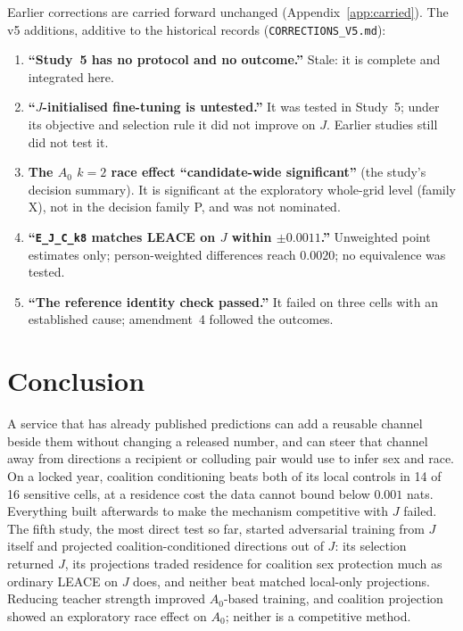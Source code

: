\documentclass[10pt]{article}
\begin{document}
Earlier corrections are carried forward unchanged (Appendix~\ref{app:carried}). The v5 additions, additive to
the historical records (\texttt{CORRECTIONS\_V5.md}):
\begin{enumerate}\itemsep1pt
\item \textbf{``Study~5 has no protocol and no outcome.''} Stale: it is complete and integrated here.
\item \textbf{``$J$-initialised fine-tuning is untested.''} It was tested in Study~5; under its objective and
selection rule it did not improve on $J$. Earlier studies still did not test it.
\item \textbf{The $A_0$ $k=2$ race effect ``candidate-wide significant''} (the study's decision summary). It is
significant at the exploratory whole-grid level (family X), not in the decision family P, and was not nominated.
\item \textbf{``\texttt{E\_J\_C\_k8} matches LEACE on $J$ within $\pm0.0011$.''} Unweighted point estimates only;
person-weighted differences reach $0.0020$; no equivalence was tested.
\item \textbf{``The reference identity check passed.''} It failed on three cells with an established cause;
amendment~4 followed the outcomes.
\end{enumerate}

\section{Conclusion}

A service that has already published predictions can add a reusable channel beside them without changing a
released number, and can steer that channel away from directions a recipient or colluding pair would use to
infer sex and race. On a locked year, coalition conditioning beats both of its local controls in 14 of 16
sensitive cells, at a residence cost the data cannot bound below $0.001$ nats. Everything built afterwards to
make the mechanism competitive with $J$ failed. The fifth study, the most direct test so far, started
adversarial training from $J$ itself and projected coalition-conditioned directions out of $J$: its selection
returned $J$, its projections traded residence for coalition sex protection much as ordinary LEACE on $J$
does, and neither beat matched local-only projections. Reducing teacher strength improved $A_0$-based training,
and coalition projection showed an exploratory race effect on $A_0$; neither is a competitive method.
\end{document}

